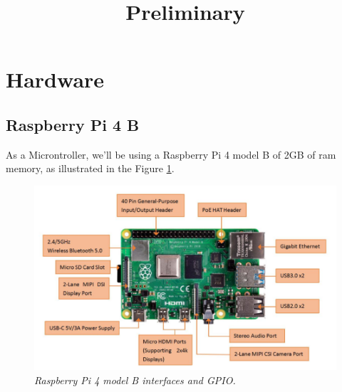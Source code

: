 \documentclass[12pt,a4paper]{article}
\author{}
\title{\textbf{Preliminary}}
\date{}
\begin{document}
	\maketitle
	
	\section{Hardware}
	\subsection{Raspberry Pi 4 B}
	As a Microntroller, we'll be using a Raspberry Pi 4 model B of 2GB of ram memory, as illustrated in the Figure \ref{fig:RasPi}.
	
    \begin{figure}[h]
    	\centering
    	\includegraphics[width=0.7\linewidth]{Imm/RasPi-Definition}
    	\caption{\textit{Raspberry Pi 4 model B interfaces and GPIO.}}
    	\label{fig:RasPi}
    \end{figure}
    
\end{document}
